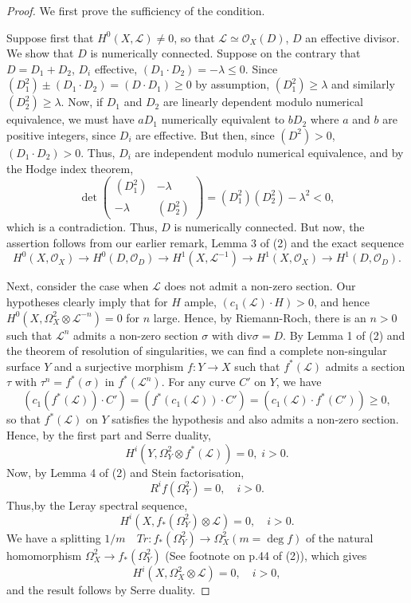 \begin{proof}
We first prove the sufficiency of the condition.


Suppose first that $H^0(X, \mathcal{L}) \neq 0$, so that $\mathcal{L} \simeq \mathcal{O}_X (D)$, $D$ an effective divisor. We show that $D$ is numerically connected. Suppose on the contrary that $D = D_1 + D_2$, $D_i$ effective, $(D_1 \cdot D_2) = - \lambda \leqslant 0$. Since $(D^2_1) \pm (D_1 \cdot D_2) = (D \cdot D_1) \geqslant 0$ by assumption, $(D^2_1) \geqslant \lambda$ and similarly $(D^2_2) \geqslant \lambda$. Now, if $D_1$ and $D_2$ are linearly dependent modulo numerical equivalence, we must have $aD_1$ numerically equivalent to $bD_2$ where $a$ and $b$ are positive integers, since $D_i$ are effective. But then, since $(D^2) > 0$, $(D_1 \cdot D_2) > 0$. Thus, $D_i$ are independent modulo numerical equivalence, and by the Hodge index theorem,
$$
\det \left(\begin{matrix} 
(D^2_1) & -\lambda\\
-\lambda  & (D^2_2) 
\end{matrix}\right) = (D^2_1) (D^2_2) - \lambda^2 < 0,
$$
which is a contradiction. Thus, $D$ is numerically connected. But now, the assertion follows from our earlier remark, Lemma 3 of (2) and the exact sequence
$$
H^0(X, \mathcal{O}_X) \to H^0 (D, \mathcal{O}_D) \to H^1 (X, \mathcal{L}^{-1}) \to H^1 (X, \mathcal{O}_X) \to H^1 (D, \mathcal{O}_D). 
$$

Next, consider the case when $\mathcal{L}$ does not admit a non-zero section. Our hypotheses clearly imply that for $H$ ample, $(c_1 (\mathcal{L}) \cdot H) > 0$, and hence $H^0 (X,\Omega^2_X \otimes \mathcal{L}^{-n}) = 0$ for $n$ large. Hence, by Riemann-Roch, there is an $n > 0$ such that $\mathcal{L}^n$ admits a non-zero section $\sigma$ with $\text{div} \sigma = D$. By Lemma 1 of (2) and the theorem of resolution of singularities, we can find a complete non-singular surface $Y$ and a surjective morphism $f: Y \to X$ such that $f^* (\mathcal{L})$ admits a section $\tau$ with $\tau^n = f^* (\sigma)$ in $f^* (\mathcal{L}^n)$. For any curve $C'$ on $Y$, we have
$$
(c_1 (f^* (\mathcal{L})) \cdot C') = (f^* (c_1 (\mathcal{L})) \cdot C') = (c_1 (\mathcal{L}) \cdot f^* (C')) \geqslant 0,
$$
so that $f^* (\mathcal{L})$ on $Y$ satisfies the hypothesis and also admits a non-zero section. Hence, by the first part and Serre duality, 
$$
H^i (Y,\Omega^2_Y \otimes f^* (\mathcal{L})) = 0, \; i > 0.
$$
Now, by Lemma 4 of (2) and Stein factorisation,
$$
R^i f(\Omega^2_Y) = 0, \quad i > 0.
$$
Thus,\pageoriginale by the Leray spectral sequence,
$$
H^i (X, f_* (\Omega^2_Y) \otimes \mathcal{L}) = 0, \quad  i > 0.
$$
We have a splitting $1/m \quad Tr: f_* (\Omega^2_Y) \to \Omega^2_X (m = \deg f)$ of the natural homomorphism $\Omega^2_X \to f_* (\Omega^2_Y)$ (See footnote on p.44 of (2)), which gives 
$$
H^i (X, \Omega^2_X \otimes \mathcal{L}) = 0, \quad i >0,
$$
and the result follows by Serre duality.


\end{proof}
